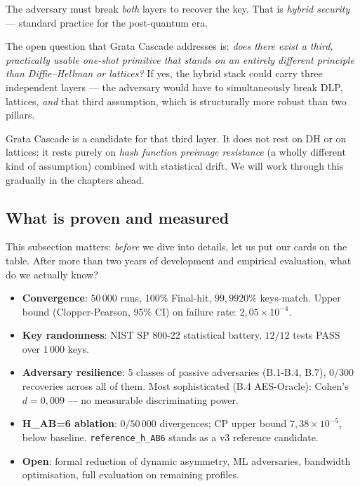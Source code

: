 \documentclass[11pt,a4paper]{article}
\begin{document}
The adversary must break \emph{both} layers to recover the key. That is \emph{hybrid security} --- standard practice for the post-quantum era.

The open question that Grata Cascade addresses is: \emph{does there exist a third, practically usable one-shot primitive that stands on an entirely different principle than Diffie--Hellman or lattices?} If yes, the hybrid stack could carry three independent layers --- the adversary would have to simultaneously break DLP, lattices, \emph{and} that third assumption, which is structurally more robust than two pillars.

Grata Cascade is a candidate for that third layer. It does not rest on DH or on lattices; it rests purely on \emph{hash function preimage resistance} (a wholly different kind of assumption) combined with statistical drift. We will work through this gradually in the chapters ahead.

\subsection{What is proven and measured}

This subsection matters: \emph{before} we dive into details, let us put our cards on the table. After more than two years of development and empirical evaluation, what do we actually know?

\begin{tldr}
\begin{itemize}[leftmargin=*]
\item \textbf{Convergence}: $50\,000$ runs, $100\%$ Final-hit, $99{,}9920\%$ keys-match. Upper bound (Clopper-Pearson, 95\% CI) on failure rate: $2{,}05 \times 10^{-4}$.
\item \textbf{Key randomness}: NIST SP 800-22 statistical battery, $12/12$ tests PASS over $1\,000$ keys.
\item \textbf{Adversary resilience}: 5 classes of passive adversaries (B.1-B.4, B.7), $0/300$ recoveries across all of them. Most sophisticated (B.4 AES-Oracle): Cohen's $d = 0{,}009$ --- no measurable discriminating power.
\item \textbf{H\_AB=6 ablation}: $0/50\,000$ divergences; CP upper bound $7{,}38 \times 10^{-5}$, below baseline. \texttt{reference\_h\_AB6} stands as a v3 reference candidate.
\item \textbf{Open}: formal reduction of dynamic asymmetry, ML adversaries, bandwidth optimisation, full evaluation on remaining profiles.
\end{itemize}
\end{tldr}
\end{document}
